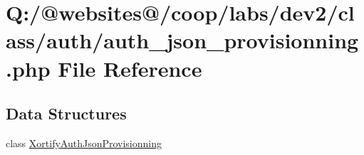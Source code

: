 \hypertarget{auth__json__provisionning_8php}{\section{Q\-:/@websites@/coop/labs/dev2/class/auth/auth\-\_\-json\-\_\-provisionning.php File Reference}
\label{auth__json__provisionning_8php}
}
\subsection*{Data Structures}
\begin{DoxyCompactItemize}
\item 
class \hyperlink{class_xortify_auth_json_provisionning}{Xortify\-Auth\-Json\-Provisionning}
\end{DoxyCompactItemize}
